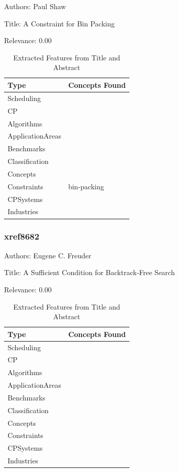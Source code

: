 Authors: Paul Shaw

Title: A Constraint for Bin Packing

Relevance:  0.00

{\scriptsize
\begin{longtable}{p{2cm}p{20cm}}
\caption{Extracted Features from Title and Abstract}\\ \toprule
Type & Concepts Found\\ \midrule
\endhead
\bottomrule
\endfoot
Scheduling & \\ 
CP & \\ 
Algorithms & \\ 
ApplicationAreas & \\ 
Benchmarks & \\ 
Classification & \\ 
Concepts & \\ 
Constraints & bin-packing\\ 
CPSystems & \\ 
Industries & \\ 
\end{longtable}
}



\subsubsection{xref8682}
\label{mw:xref8682}

Authors: Eugene C. Freuder

Title: A Sufficient Condition for Backtrack-Free Search

Relevance:  0.00

{\scriptsize
\begin{longtable}{p{2cm}p{20cm}}
\caption{Extracted Features from Title and Abstract}\\ \toprule
Type & Concepts Found\\ \midrule
\endhead
\bottomrule
\endfoot
Scheduling & \\ 
CP & \\ 
Algorithms & \\ 
ApplicationAreas & \\ 
Benchmarks & \\ 
Classification & \\ 
Concepts & \\ 
Constraints & \\ 
CPSystems & \\ 
Industries & \\ 
\end{longtable}
}



